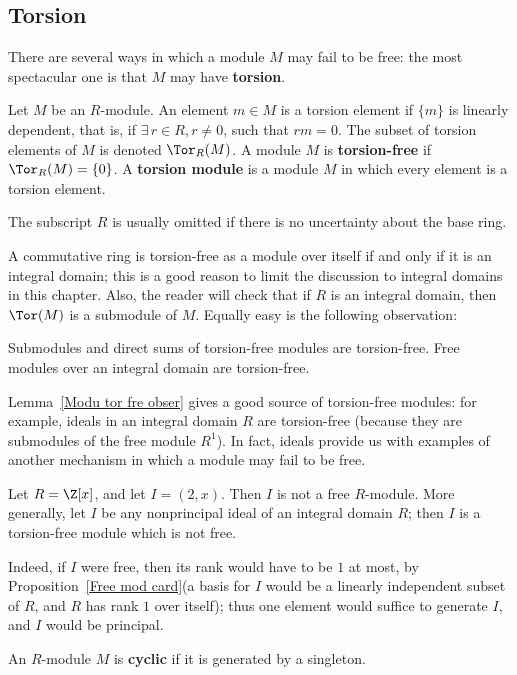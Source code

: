 \subsection{Torsion} 
There are several ways in which a module $M$ may fail to be free: the most spectacular one is that $M$ may have \textbf{torsion}.
\begin{definition}
Let $M$ be an $R$-module. An element $m\in M$ is a torsion element if $\{m\}$ is linearly dependent, that is, if $\exists\,r\in R, r\neq0$, such that $rm=0$. The subset of torsion elements of $M$ is denoted $\Tor_R(M)$. A module $M$ is \textbf{torsion-free} if $\Tor_R(M)=\{0\}$. A \textbf{torsion module} is a module $M$ in which every element is a torsion element.
\end{definition}
The subscript $R$ is usually omitted if there is no uncertainty about the base ring.\par
A commutative ring is torsion-free as a module over itself if and only if it is an integral domain; this is a good reason to limit the discussion to integral domains in this chapter. Also, the reader will check that if $R$ is an integral domain, then $\Tor(M)$ is a submodule of $M$. Equally easy is the following observation:
\begin{lemma}\label{Modu tor fre obser}
Submodules and direct sums of torsion-free modules are torsion-free. Free modules over an integral domain are torsion-free.
\end{lemma}
Lemma~\ref{Modu tor fre obser} gives a good source of torsion-free modules: for example, ideals
in an integral domain $R$ are torsion-free (because they are submodules of the free module $R^1$). In fact, ideals provide us with examples of another mechanism in which a module may fail to be free.
\begin{example}
Let $R=\Z[x]$, and let $I=(2,x)$. Then $I$ is not a free $R$-module. More generally, let $I$ be any nonprincipal ideal of an integral domain $R$; then $I$ is a torsion-free module which is not free.\par
Indeed, if $I$ were free, then its rank would have to be $1$ at most, by Proposition~\ref{Free mod card}(a basis for $I$ would be a linearly independent subset of $R$, and $R$ has rank $1$ over itself); thus one element would suffice to generate $I$, and $I$ would be principal.
\end{example}
\begin{definition}
An $R$-module $M$ is \textbf{cyclic} if it is generated by a singleton.
\end{definition}
